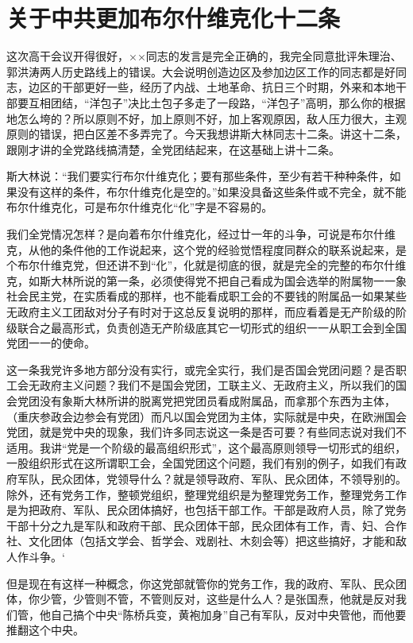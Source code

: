 \section[关于中共更加布尔什维克化十二条（一九四二年十一月二十三日）]{关于中共更加布尔什维克化十二条}


这次高干会议开得很好，××同志的发言是完全正确的，我完全同意批评朱理治、郭洪涛两人历史路线上的错误。大会说明创造边区及参加边区工作的同志都是好同志，边区的干部更好一些，经历了内战、土地革命、抗日三个时期，外来和本地干部要互相团结，“洋包子”决比土包子多走了一段路，“洋包子”高明，那么你的根据地怎么垮的？所以原则不好，加上原则不好，加上客观原因，敌人压力很大，主观原则的错误，把白区差不多弄完了。今天我想讲斯大林同志十二条。讲这十二条，跟刚才讲的全党路线搞清楚，全党团结起来，在这基础上讲十二条。

斯大林说：“我们要实行布尔什维克化；要有那些条件，至少有若干种种条件，如果没有这样的条件，布尔什维克化是空的。”如果没具备这些条件或不完全，就不能布尔什维克化，可是布尔什维克化“化”字是不容易的。

我们全党情况怎样？是向着布尔什维克化，经过廿一年的斗争，可说是布尔什维克，从他的条件他的工作说起来，这个党的经验觉悟程度同群众的联系说起来，是个布尔什维克党，但还讲不到“化”，化就是彻底的很，就是完全的完整的布尔什维克，如斯大林所说的第一条，必须使得党不把自己看成为国会选举的附属物一一象社会民主党，在实质看成的那样，也不能看成职工会的不要钱的附属品一如果某些无政府主义工团敌对分子有时对于这总反复说明的那样，而应看着是无产阶级的阶级联合之最高形式，负责创造无产阶级底其它一切形式的组织一一从职工会到全国党团一一的使命。

这一条我党许多地方部分没有实行，或完全实行，我们是否国会党团问题？是否职工会无政府主义问题？我们不是国会党团，工联主义、无政府主义，所以我们的国会党团没有象斯大林所讲的脱离党把党团员看成附属品，而拿那个东西为主体，（重庆参政会边参会有党团）而凡以国会党团为主体，实际就是中央，在欧洲国会党团，就是党中央的现象，我们许多同志说这一条是否可要？有些同志说对我们不适用。我讲“党是一个阶级的最高组织形式”，这个最高原则领导一切形式的组织，一股组织形式在这所谓职工会，全国党团这个问题，我们有别的例子，如我们有政府军队，民众团体，党领导什么？就是领导政府、军队、民众团体，不领导别的。除外，还有党务工作，整顿党组织，整理党组织是为整理党务工作，整理党务工作是为把政府、军队、民众团体搞好，也包括干部工作。干部是政府人员，除了党务干部十分之九是军队和政府干部、民众团体干部，民众团体有工作，青、妇、合作社、文化团体（包括文学会、哲学会、戏剧社、木刻会等）把这些搞好，才能和敌人作斗争。‘

但是现在有这样一种概念，你这党部就管你的党务工作，我的政府、军队、民众团体，你少管，少管则不管，不管则反对，这些是什么人？是张国焘，他就是反对我们管，他自己搞个中央“陈桥兵变，黄袍加身”自己有军队，反对中央管他，而他要推翻这个中央。

